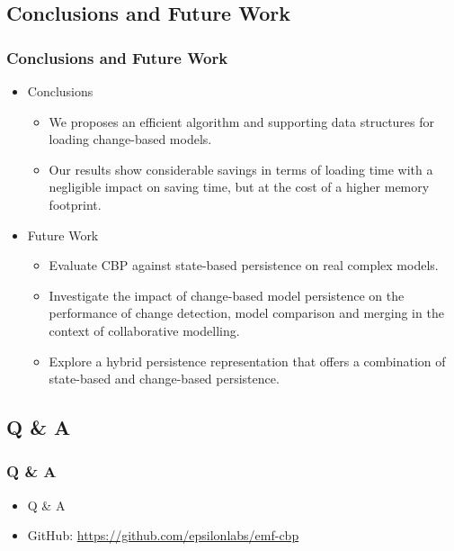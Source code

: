 \documentclass{beamer}
\begin{document}
\begin{frame}[fragile]
\section{Conclusions and Future Work}
\frametitle{Conclusions and Future Work}
\begin{itemize}
    \item Conclusions
    \begin{itemize}
        \item We proposes an efficient algorithm and supporting data structures for loading change-based models.
        \item Our results show considerable savings in terms of loading time with a negligible impact on saving time, but at the cost of a higher memory footprint.
    \end{itemize}
    \item Future Work
    \begin{itemize}
        \item Evaluate CBP against state-based persistence on real complex models.
        \item Investigate the impact of change-based model
        persistence on the performance of change detection, model comparison and merging in the context of collaborative modelling.
        \item Explore a hybrid persistence representation that offers a combination of state-based and change-based
        persistence.
    \end{itemize}   
\end{itemize}
\end{frame}



\begin{frame}[fragile]
\section{Q \& A}
\frametitle{Q \& A}
\begin{itemize}
    \item \begin{LARGE}
        Q \& A
    \end{LARGE}
    \item GitHub: \url{https://github.com/epsilonlabs/emf-cbp}
\end{itemize}
\end{frame}
\end{document}
